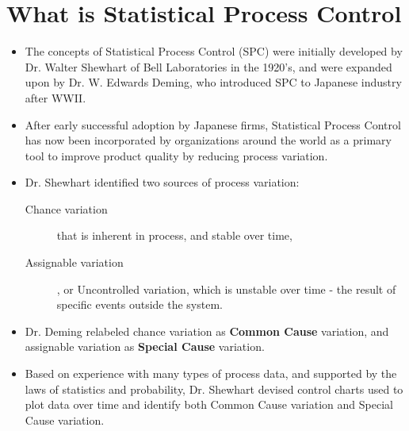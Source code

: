 \documentclass[]{report}
\begin{document}
\newpage
\section{What is Statistical Process Control}
{
	\large
	\begin{itemize}
		\item The concepts of Statistical Process Control (SPC) were initially developed by Dr. Walter Shewhart of Bell Laboratories in the 1920's, and were expanded upon by Dr. W. Edwards Deming, who introduced SPC to Japanese industry after WWII.
		\item After early successful adoption by Japanese firms, Statistical Process Control has now been incorporated by organizations around the world as a primary tool to improve product quality by reducing process variation.
		\item Dr. Shewhart identified two sources of process variation: 
		\begin{description}
			\item[Chance variation] that is inherent in process, and stable over time, 
			\item[Assignable variation], or Uncontrolled variation, which is unstable over time - the result of specific events outside the system.
		\end{description}
		
		\item Dr. Deming relabeled chance variation as \textbf{Common Cause} variation, and assignable variation as \textbf{Special Cause} variation.
		\item Based on experience with many types of process data, and supported by the laws of statistics and probability, Dr. Shewhart devised control charts used to plot data over time and identify both Common Cause variation and Special Cause variation.
	\end{itemize}
}
%
\end{document}
